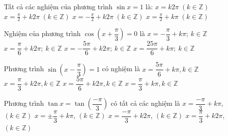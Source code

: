 \begin{ex}%
	Tất cả các nghiệm của phương trình $\sin x = 1$ là:
	\choice
	{$x = k2\pi \; (k \in \mathbb{Z})$}
	{\True $x = \frac{\pi}{2} + k2\pi \; (k \in \mathbb{Z})$}
	{$x = -\frac{\pi}{2} + k2\pi \; (k \in \mathbb{Z})$}
	{$x = \frac{\pi}{2} + k\pi \; (k \in \mathbb{Z})$}
\end{ex}

\begin{ex}%
	Nghiệm của phương trình $\cos \left(x+\dfrac{\pi }{3}\right)=0$ là 
	\choice 
		{ $ x=-\dfrac{\pi  }{3}+k\pi; ~k\in \mathbb{Z}$}
		{\True $  x=\dfrac{\pi }{6}+k2\pi; ~k\in \mathbb{Z}$}
		{ $  x=-\dfrac{5\pi }{6}+k2\pi; ~k\in \mathbb{Z}$}
		{ $ x=\dfrac{25\pi }{6}+k\pi; ~k\in \mathbb{Z}$} 
\end{ex}

\begin{ex}%
	Phương trình $ \sin \left(x-\dfrac{\pi}{3}\right)=1 $  có nghiệm là
	\choice 
		{$x=\dfrac{5\pi}{6}+k\pi, k\in \mathbb{Z} $} 
		 {$x=\dfrac{\pi}{3}+k2\pi, k\in \mathbb{Z} $}
		{\True $x=\dfrac{5\pi}{6}+k2\pi, k\in  \mathbb{Z} $}
		 {$x=\dfrac{\pi}{3}+k\pi, k\in \mathbb{Z} $}
\end{ex}

\begin{ex}%
	Phương trình $ \tan x=\tan\left(\dfrac{-\pi}{3}\right)$ có tất cả các  nghiệm là
	\choice 
		{\True  $x=\dfrac{-\pi}{3}+k\pi$, $(k\in\mathbb{Z})$}
		 {$x=\pm \dfrac{\pi}{3}+k\pi$, $(k\in\mathbb{Z})$}
		 {$x=\dfrac{-\pi}{3}+k2\pi$, $(k\in\mathbb{Z})$}
		{$x=\dfrac{\pi}{3}+k2\pi$, $(k\in\mathbb{Z})$} 
\end{ex}

